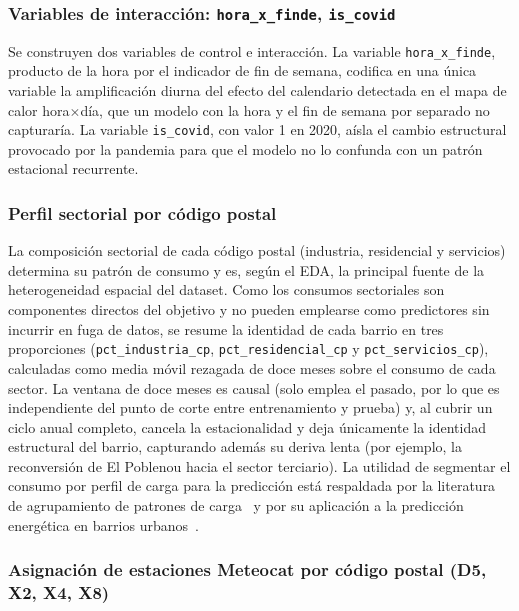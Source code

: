 \documentclass[12pt, a4paper]{article}
\begin{document}
\subsubsection{Variables de interacción: \texttt{hora\_x\_finde}, \texttt{is\_covid}}


Se construyen dos variables de control e interacción. La variable \texttt{hora\_x\_finde}, producto de la hora por el indicador de fin de semana, codifica en una única variable la amplificación diurna del efecto del calendario detectada en el mapa de calor hora$\times$día, que un modelo con la hora y el fin de semana por separado no capturaría. La variable \texttt{is\_covid}, con valor 1 en 2020, aísla el cambio estructural provocado por la pandemia para que el modelo no lo confunda con un patrón estacional recurrente.

\subsubsection{Perfil sectorial por código postal}


La composición sectorial de cada código postal (industria, residencial y servicios) determina su patrón de consumo y es, según el EDA, la principal fuente de la heterogeneidad espacial del dataset. Como los consumos sectoriales son componentes directos del objetivo y no pueden emplearse como predictores sin incurrir en fuga de datos, se resume la identidad de cada barrio en tres proporciones (\texttt{pct\_industria\_cp}, \texttt{pct\_residencial\_cp} y \texttt{pct\_servicios\_cp}), calculadas como media móvil rezagada de doce meses sobre el consumo de cada sector. La ventana de doce meses es causal (solo emplea el pasado, por lo que es independiente del punto de corte entre entrenamiento y prueba) y, al cubrir un ciclo anual completo, cancela la estacionalidad y deja únicamente la identidad estructural del barrio, capturando además su deriva lenta (por ejemplo, la reconversión de El Poblenou hacia el sector terciario). La utilidad de segmentar el consumo por perfil de carga para la predicción está respaldada por la literatura de agrupamiento de patrones de carga~\cite{rajabi2020} y por su aplicación a la predicción energética en barrios urbanos~\cite{jiang2024}.

\subsubsection{Asignación de estaciones Meteocat por código postal (D5, X2, X4, X8)}
\end{document}
